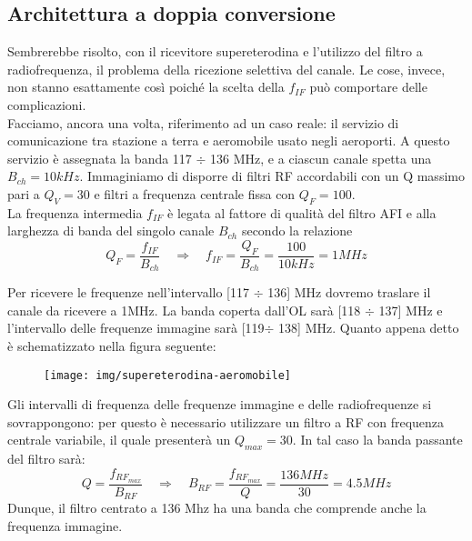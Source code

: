 \subsection{Architettura a doppia conversione}

Sembrerebbe risolto, con il ricevitore supereterodina e l'utilizzo del filtro a radiofrequenza, il problema della ricezione selettiva del canale. Le cose, invece, non stanno esattamente così poiché la scelta della $f_{IF}$ può comportare delle complicazioni.\\
Facciamo, ancora una volta, riferimento ad un caso reale: il servizio di comunicazione tra stazione a terra e aeromobile usato negli aeroporti. A questo servizio è assegnata la banda 117 $\div$ 136 MHz, e a ciascun canale spetta una $B_{ch} = 10kHz$. Immaginiamo di disporre di filtri RF accordabili con un Q massimo pari a $Q_V = 30$ e filtri a frequenza centrale fissa con $Q_F = 100$.
\\
La frequenza intermedia $f_{IF}$ è legata al fattore di qualità del filtro AFI e alla larghezza di banda del singolo canale $B_{ch}$ secondo la relazione
\[
Q_F =\frac{f_{IF}}{B_{ch}}
\quad\Rightarrow\quad
f_{IF} = \frac{Q_F}{B_{ch}} = \frac{100}{10 kHz} = 1 MHz
\]

Per ricevere le frequenze nell'intervallo [117 $\div$ 136] MHz dovremo traslare il canale da ricevere a 1MHz. La banda coperta dall'OL sarà [118 $\div$ 137] MHz e l'intervallo delle frequenze immagine sarà [119$\div$ 138] MHz. Quanto appena detto è schematizzato nella figura seguente:

\begin{figure}[hbt]
	\centering
	\texttt{[image: img/supereterodina-aeromobile]}
	\caption{}
	\label{fig:supereterodina-aeromobile}
\end{figure}

Gli intervalli di frequenza delle frequenze immagine e delle radiofrequenze si sovrappongono: per questo è necessario
utilizzare un filtro a RF con frequenza centrale variabile, il quale presenterà un $Q_{max} = 30$. In tal caso la banda passante del filtro sarà:
\[
Q = \frac{f_{RF_{max}}}{B_{RF}}
\quad\Rightarrow\quad
B_{RF} =
\frac{f_{RF_{max}}}{Q} = \frac{136 MHz}{30}
= 4.5 MHz
\]
Dunque, il filtro centrato a 136 Mhz ha una banda che comprende anche la frequenza immagine.

